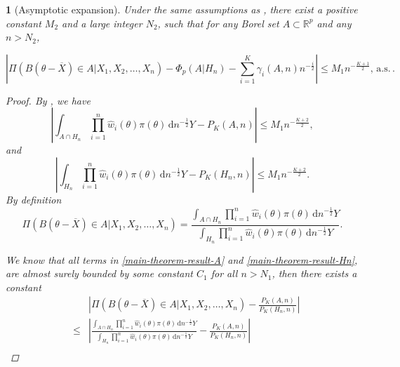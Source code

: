 \documentclass[oneside,english]{amsbook}
\numberwithin{section}{chapter}
\numberwithin{equation}{section}
\numberwithin{figure}{section}
\theoremstyle{plain}
\theoremstyle{plain}
\theoremstyle{definition}
\theoremstyle{plain}
\newtheorem{thm}{\protect\theoremname}
\theoremstyle{plain}
\theoremstyle{remark}
\theoremstyle{definition}
\theoremstyle{definition}
\newcommand{\diff}{\,\mathrm{d}}
\newcommand{\ascv}{\,\mathrm{a.s.}\,}
\providecommand{\theoremname}{Theorem}
\begin{document}
\begin{thm}[Asymptotic expansion]
Under the same assumptions as , there exist
a positive constant $M_{2}$ and a large integer $N_{2}$, such that
for any Borel set $A\subset\mathbb{R}^{p}$ and any $n>N_{2}$,%

{} 
\begin{equation}
\left|\Pi\left(B\left(\theta-\overline{X}\right)\in A|X_{1},X_{2},\ldots,X_{n}\right)-\Phi_{p}\left(A|H_{n}\right)-\sum_{i=1}^{K}\gamma_{i}\left(A,n\right)n^{-\frac{i}{2}}\right|\le M_{1}n^{-\frac{K+1}{2}},\ascv.\label{eq:asym-exp-poster-prob}
\end{equation}

\begin{proof}
By , we have 
\begin{equation}
\left|\int_{A\cap H_{n}}\prod_{i=1}^{n}\hat{w}_{i}\left(\theta\right)\pi\left(\theta\right)\diff n^{-\frac{1}{2}}Y-P_{K}\left(A,n\right)\right|\le M_{1}n^{-\frac{K+2}{2}},\label{eq:main-theorem-result-A}
\end{equation}
and 
\begin{equation}
\left|\int_{H_{n}}\prod_{i=1}^{n}\hat{w}_{i}\left(\theta\right)\pi\left(\theta\right)\diff n^{-\frac{1}{2}}Y-P_{K}\left(H_{n},n\right)\right|\le M_{1}n^{-\frac{K+2}{2}}.\label{eq:main-theorem-result-Hn}
\end{equation}
By definition 
\[
\Pi\left(B\left(\theta-\overline{X}\right)\in A|X_{1},X_{2},\ldots,X_{n}\right)=\frac{\int_{A\cap H_{n}}\prod_{i=1}^{n}\hat{w}_{i}\left(\theta\right)\pi\left(\theta\right)\diff n^{-\frac{1}{2}}Y}{\int_{H_{n}}\prod_{i=1}^{n}\hat{w}_{i}\left(\theta\right)\pi\left(\theta\right)\diff n^{-\frac{1}{2}}Y}.
\]

We know that all terms in \eqref{main-theorem-result-A} and \eqref{main-theorem-result-Hn},
are almost surely bounded by some constant $C_{1}$ for all $n>N_{1}$,
then there exists a constant 
\begin{eqnarray}
 &  & \left|\Pi\left(B\left(\theta-\overline{X}\right)\in A|X_{1},X_{2},\ldots,X_{n}\right)-\frac{P_{K}\left(A,n\right)}{P_{K}\left(H_{n},n\right)}\right|\nonumber \\
 & \le & \left|\frac{\int_{A\cap H_{n}}\prod_{i=1}^{n}\hat{w}_{i}\left(\theta\right)\pi\left(\theta\right)\diff n^{-\frac{1}{2}}Y}{\int_{H_{n}}\prod_{i=1}^{n}\hat{w}_{i}\left(\theta\right)\pi\left(\theta\right)\diff n^{-\frac{1}{2}}Y}-\frac{P_{K}\left(A,n\right)}{P_{K}\left(H_{n},n\right)}\right|\nonumber \\

\end{eqnarray}
\end{proof}
\end{thm}
\end{document}
